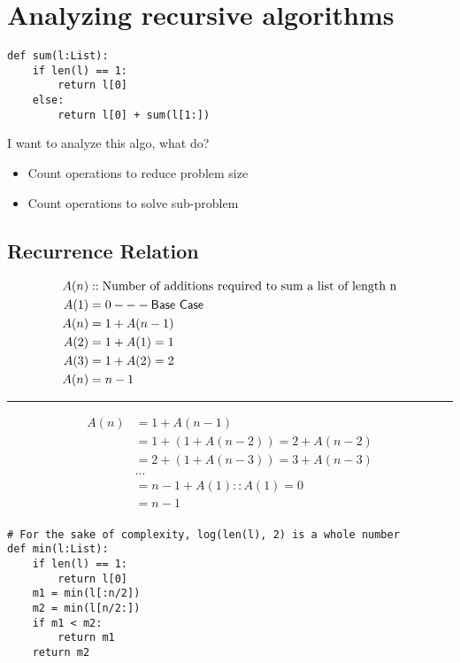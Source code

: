 \documentclass[11pt]{article}
\author{davec}
\date{\today}
\title{}
\begin{document}
\tableofcontents

\section{Analyzing recursive algorithms}
\label{sec:org9d38492}

\begin{verbatim}
def sum(l:List):
    if len(l) == 1:
        return l[0]
    else:
        return l[0] + sum(l[1:])
\end{verbatim}

I want to analyze this algo, what do?
\begin{itemize}
\item Count operations to reduce problem size
\item Count operations to solve sub-problem
\end{itemize}

\subsection{Recurrence Relation}
\label{sec:org5ca0cac}
\begin{equation}
  \begin{align}
   A(n) &:: \textnormal{Number of additions required to sum a list of length n} \\
   A(1) &= 0 --- \textsf{Base Case} \\
   A(n) &= 1 + A(n-1) \\
   A(2) &= 1 + A(1) = 1 \\
   A(3) &= 1 + A(2) = 2 \\
   A(n) &= n-1 \\
  \end{align}
\end{equation}

\noindent\rule{\textwidth}{0.5pt}
\begin{equation}
  \begin{align}
   A(n) &= 1 + A(n-1) \\
        &= 1 + (1 + A(n-2)) = 2 + A(n-2) \\
        &= 2 + (1 + A(n-3)) = 3 + A(n-3) \\
        &... \\
        &= n - 1 + A(1) :: A(1) = 0 \\
        &= n - 1 \\
  \end{align}
\end{equation}

\begin{verbatim}
# For the sake of complexity, log(len(l), 2) is a whole number
def min(l:List):
    if len(l) == 1:
        return l[0]
    m1 = min(l[:n/2])
    m2 = min(l[n/2:])
    if m1 < m2:
        return m1
    return m2
\end{verbatim}
\end{document}
